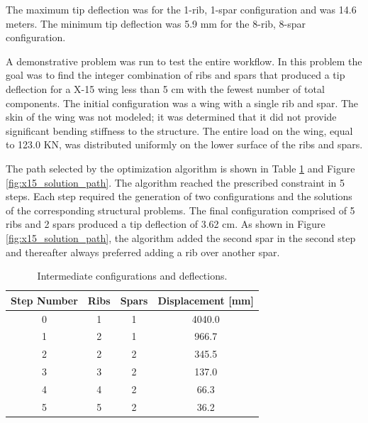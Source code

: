 \documentclass[conf]{new-aiaa}
\begin{document}
The maximum tip deflection was for the 
1-rib, 1-spar configuration and was 14.6 meters.
The minimum tip deflection was 5.9 mm for
the 8-rib, 8-spar configuration.

A demonstrative problem was run to test the entire workflow. 
In this problem the goal was to find the integer combination of 
ribs and spars that produced a tip deflection for a X-15 wing 
less than 5 cm with the fewest number of total components. 
The initial configuration was a wing with a single rib and spar. 
The skin of the wing was not modeled;
it was determined that it 
did not provide significant bending stiffness to the structure. 
The entire load on the wing, equal to 123.0  KN, was 
distributed uniformly on the lower surface of the ribs and spars.

The path selected by the optimization algorithm is shown 
in Table \ref{tab:solution_path} and Figure \ref{fig:x15_solution_path}.
The algorithm reached the prescribed constraint in 5 steps.
Each step required the generation of two configurations 
and the solutions of the corresponding structural problems.
The final configuration comprised of 5 ribs and 2 spars produced 
a tip deflection of 3.62 cm. 
As shown in Figure \ref{fig:x15_solution_path}, 
the algorithm added the second spar in the second step 
and thereafter always preferred adding a rib over another spar.

\begin{table}[H]
  \centering
  \caption{
      Intermediate configurations and deflections.  }
  \begin{tabular}{| c | c | c | c |}
    \hline
    Step Number & Ribs  & Spars & Displacement [mm] \\ 
    \hline
    0 & 1 &  1        &  4040.0             \\
    1 & 2 &  1        &   966.7             \\
    2 & 2 &  2        &   345.5             \\
    3 & 3 &  2        &   137.0             \\
    4 & 4 &  2        &    66.3             \\
    5 & 5 &  2        &    36.2             \\
    \hline
  \end{tabular}
  \label{tab:solution_path}
\end{table}
\end{document}
